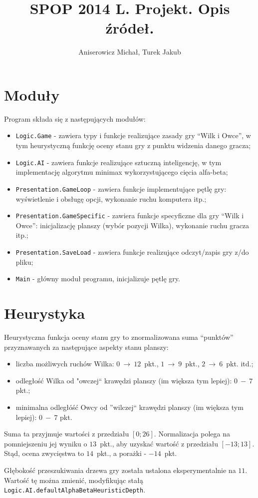 \documentclass[a4paper,12pt]{article}
\title{SPOP 2014 L. Projekt. Opis źródeł.}
\author{Aniserowicz Michał, Turek Jakub}
\date{}
\begin{document}
\maketitle

\section{Moduły}

Program składa się z następujących modułów:

\begin{itemize}
 \item \verb+Logic.Game+ - zawiera typy i funkcje realizujące zasady gry ``Wilk i Owce'', w tym heurystyczną funkcję oceny stanu gry z punktu widzenia danego gracza;
 \item \verb+Logic.AI+ - zawiera funkcje realizujące sztuczną inteligencję, w tym implementację algorytmu minimax wykorzystującego cięcia alfa-beta;
 \item \verb+Presentation.GameLoop+ - zawiera funkcje implementujące pętlę gry: wyświetlenie i obsługę opcji, wykonanie ruchu komputera itp.;
 \item \verb+Presentation.GameSpecific+ - zawiera funkcje specyficzne dla gry ``Wilk i Owce'': inicjalizację planszy (wybór pozycji Wilka), wykonanie ruchu gracza itp.;
 \item \verb+Presentation.SaveLoad+ - zawiera funkcje realizujące odczyt/zapis gry z/do pliku;
 \item \verb+Main+ - główny moduł programu, inicjalizuje pętlę gry.
\end{itemize}


\section{Heurystyka}

Heurystyczna funkcja oceny stanu gry to znormalizowana suma ``punktów'' przyznawanych za następujące aspekty stanu planszy:
\begin{itemize}
 \item liczba możliwych ruchów Wilka: $0~\rightarrow~12$~pkt., $1~\rightarrow~9$~pkt., $2~\rightarrow~6$~pkt. itd.;
 \item odległość Wilka od "owczej`` krawędzi planszy (im większa tym lepiej): $0~-~7$ pkt.;
 \item minimalna odległóść Owcy od ''wilczej`` krawędzi planszy (im większa tym lepiej): $0~-~7$ pkt.
\end{itemize}

Suma ta przyjmuje wartości z przedziału $[0; 26]$.
Normalizacja polega na pomniejszeniu jej wyniku o $13$~pkt., aby uzyskać wartość z przedziału $[-13; 13]$.
Stąd, ocena zwycięstwa to $14$~pkt., a porażki - $-14$~pkt.

Głębokość przeszukiwania drzewa gry została ustalona eksperymentalnie na $11$.
Wartość tę można zmienić, modyfikując stałą \verb+Logic.AI.defaultAlphaBetaHeuristicDepth+.
\end{document}
